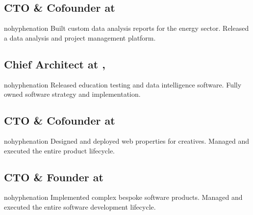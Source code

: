 \fullwidthmode
{
\subsection{\textbf{CTO \& Cofounder} at  \shyears{[2011-PRESENT]}}
\begin{sloppypar}\begin{hyphenrules}{nohyphenation}
\small{Built custom data analysis reports for the energy sector.  Released a data analysis and project management platform.}
\end{hyphenrules}\end{sloppypar}
\medskip

\subsection{\textbf{Chief Architect} at ,  \shyears{[2008-2014]}}
\begin{sloppypar}\begin{hyphenrules}{nohyphenation}
\small{Released education testing and data intelligence software.  Fully owned software strategy and implementation.}
\end{hyphenrules}\end{sloppypar}
\medskip

\subsection{\textbf{CTO \& Cofounder} at  \shyears{[2006-2008]}}
\begin{sloppypar}\begin{hyphenrules}{nohyphenation}
\small{Designed and deployed web properties for creatives.  Managed and executed the entire product lifecycle.}
\end{hyphenrules}\end{sloppypar}
\medskip

\subsection{\textbf{CTO \& Founder} at  \shyears{[1997-2008]}}
\begin{sloppypar}\begin{hyphenrules}{nohyphenation}
\small{Implemented complex bespoke software products.  Managed and executed the entire software development lifecycle.}
\end{hyphenrules}\end{sloppypar}
\medskip

}
